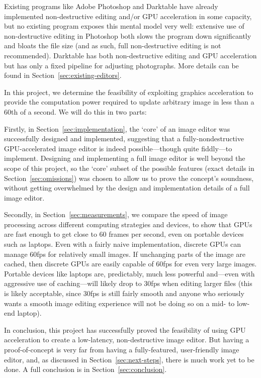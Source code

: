 \documentclass[12pt]{article}
\begin{document}
Existing programs like Adobe Photoshop and Darktable have already implemented non-destructive
editing and/or GPU acceleration in some capacity, but no existing program exposes this mental model
very well: extensive use of non-destructive editing in Photoshop both slows the program down
significantly and bloats the file size (and as such, full non-destructive editing is not
recommended).   Darktable has both non-destructive editing and GPU acceleration but has only a
fixed pipeline for adjusting photographs.  More details can be found in
Section~\ref{sec:existing-editors}.

In this project, we determine the feasibility of exploiting graphics acceleration to provide the
computation power required to update arbitrary image in less than a 60th of a second.  We will do
this in two parts:

Firstly, in Section~\ref{sec:implementation}, the `core' of an image editor was successfully
designed and implemented, suggesting that a fully-nondestructive GPU-accelerated image editor is
indeed possible---though quite fiddly---to implement.  Designing and implementing a full image
editor is well beyond the scope of this project, so the `core' subset of the possible features
(exact details in Section~\ref{sec:omissions}) was chosen to allow us to prove the concept's
soundness, without getting overwhelmed by the design and implementation details of a full image
editor.

Secondly, in Section~\ref{sec:measurements}, we compare the speed of image processing across
different computing strategies and devices, to show that GPUs are fast enough to get close to 60
frames per second, even on portable devices such as laptops.  Even with a fairly naive
implementation, discrete GPUs can manage 60fps for relatively small images.  If unchanging parts of
the image are cached, then discrete GPUs are easily capable of 60fps for even very large images.
Portable devices like laptops are, predictably, much less powerful and---even with aggressive use of
caching---will likely drop to 30fps when editing larger files (this is likely acceptable, since
30fps is still fairly smooth and anyone who seriously wants a smooth image editing experience will
not be doing so on a mid- to low-end laptop).

In conclusion, this project has successfully proved the feasibility of using GPU acceleration
to create a low-latency, non-destructive image editor.  But having a proof-of-concept is very far
from having a fully-featured, user-friendly image editor, and, as discussed in
Section~\ref{sec:next-steps}, there is much work yet to be done.  A full conclusion is in
Section~\ref{sec:conclusion}.
\end{document}
